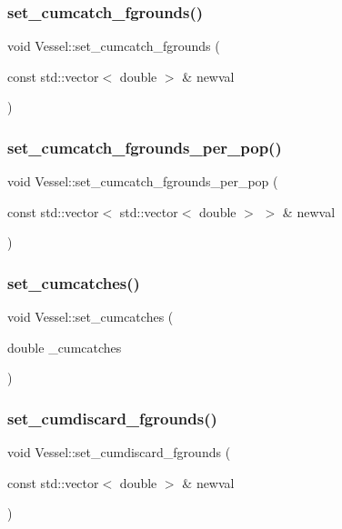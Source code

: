 \subsubsection{\texorpdfstring{set\_cumcatch\_fgrounds()}{set\_cumcatch\_fgrounds()}}
{\footnotesize\ttfamily void Vessel\+::set\+\_\+cumcatch\+\_\+fgrounds (\begin{DoxyParamCaption}\item[{const std\+::vector$<$ double $>$ \&}]{newval }\end{DoxyParamCaption})}

\mbox{\label{class_vessel_a8b44f8261d1ca80cc5e86603cd52852a}} 
\subsubsection{\texorpdfstring{set\_cumcatch\_fgrounds\_per\_pop()}{set\_cumcatch\_fgrounds\_per\_pop()}}
{\footnotesize\ttfamily void Vessel\+::set\+\_\+cumcatch\+\_\+fgrounds\+\_\+per\+\_\+pop (\begin{DoxyParamCaption}\item[{const std\+::vector$<$ std\+::vector$<$ double $>$ $>$ \&}]{newval }\end{DoxyParamCaption})}

\mbox{\label{class_vessel_ac8a4da4161e36f9ca7e0e001a0c2f2dd}} 
\subsubsection{\texorpdfstring{set\_cumcatches()}{set\_cumcatches()}}
{\footnotesize\ttfamily void Vessel\+::set\+\_\+cumcatches (\begin{DoxyParamCaption}\item[{double}]{\+\_\+cumcatches }\end{DoxyParamCaption})}

\mbox{\label{class_vessel_abfbbb790a0376a77a57d941e032a90ac}} 
\subsubsection{\texorpdfstring{set\_cumdiscard\_fgrounds()}{set\_cumdiscard\_fgrounds()}}
{\footnotesize\ttfamily void Vessel\+::set\+\_\+cumdiscard\+\_\+fgrounds (\begin{DoxyParamCaption}\item[{const std\+::vector$<$ double $>$ \&}]{newval }\end{DoxyParamCaption})}


